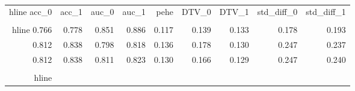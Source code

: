\begin{table}[h]
\centering
\caption{}
\label{wd_para_0.0_wd_24.087810516357422}
\begin{tabular}{rrrrrrrrr}
\\hline
 acc\_0 &  acc\_1 &  auc\_0 &  auc\_1 &  pehe &  DTV\_0 &  DTV\_1 &  std\_diff\_0 &  std\_diff\_1 \\
\\hline
 0.766 &  0.778 &  0.851 &  0.886 & 0.117 &  0.139 &  0.133 &       0.178 &       0.193 \\
 0.812 &  0.838 &  0.798 &  0.818 & 0.136 &  0.178 &  0.130 &       0.247 &       0.237 \\
 0.812 &  0.838 &  0.811 &  0.823 & 0.130 &  0.166 &  0.129 &       0.247 &       0.240 \\
\\hline
\end{tabular}
\end{table}
